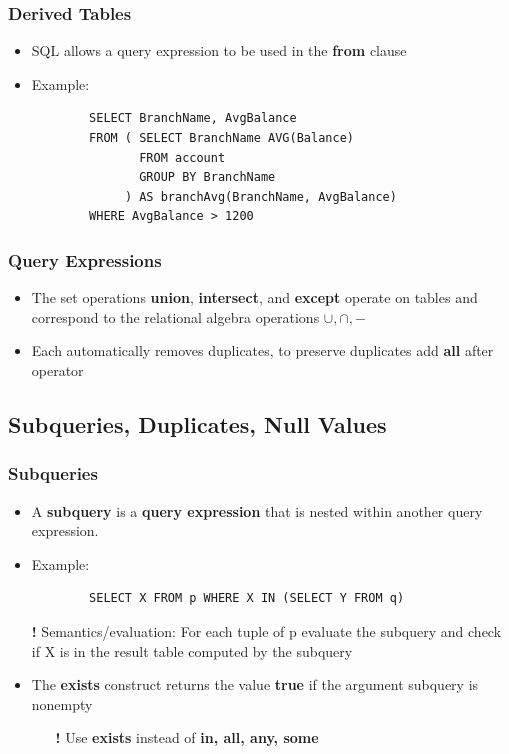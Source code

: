 \subsubsection{Derived Tables}
\begin{itemize}
    \item SQL allows a query expression to be used in the \textbf{from} clause
    \item Example:
    \begin{lstlisting}
        SELECT BranchName, AvgBalance
        FROM ( SELECT BranchName AVG(Balance)
               FROM account
               GROUP BY BranchName
             ) AS branchAvg(BranchName, AvgBalance)
        WHERE AvgBalance > 1200
    \end{lstlisting}
\end{itemize}

\subsubsection{Query Expressions}
\begin{itemize}
    \item The set operations \textbf{union}, \textbf{intersect}, and \textbf{except} operate on tables and correspond to the relational algebra operations $\cup, \cap, -$
    \item Each automatically removes duplicates, to preserve duplicates add \textbf{all} after operator
\end{itemize}

\subsection{Subqueries, Duplicates, Null Values}

\subsubsection{Subqueries}

\begin{itemize}
    \item A \textbf{subquery} is a \textbf{query expression} that is nested within another query expression.
    \item Example:
    \begin{lstlisting}
        SELECT X FROM p WHERE X IN (SELECT Y FROM q)
    \end{lstlisting}
    \item[\textbf{!}] Semantics/evaluation: For each tuple of p evaluate the subquery and check if X is in the result table computed by the subquery
    \item The \textbf{exists} construct returns the value \textbf{true} if the argument subquery is nonempty
    \begin{itemize}
        \item[\textbf{!}] Use \textbf{exists} instead of \textbf{in, all, any, some}
    \end{itemize}
\end{itemize}

